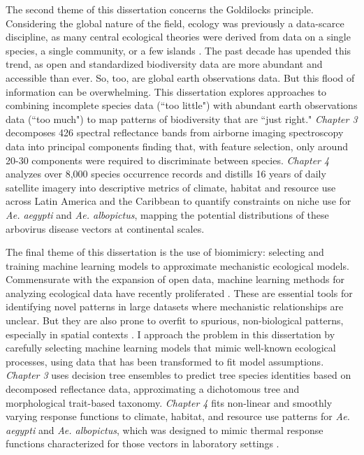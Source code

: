 The second theme of this dissertation concerns the Goldilocks principle. Considering the global nature of the field, ecology was previously a data-scarce discipline, as many central ecological theories were derived from data on a single species, a single community, or a few islands \cite{Grinnell1917-aa, Hubbell2001-lq, MacArthur1967-zp}. The past decade has upended this trend, as open and standardized biodiversity data are more abundant and accessible than ever. So, too, are global earth observations data. But this flood of information can be overwhelming. This dissertation explores approaches to combining incomplete species data (``too little") with abundant earth observations data (``too much") to map patterns of biodiversity that are ``just right." \textit{Chapter 3} decomposes 426 spectral reflectance bands from airborne imaging spectroscopy data into principal components finding that, with feature selection, only around 20-30 components were required to discriminate between species. \textit{Chapter 4} analyzes over 8,000 species occurrence records and distills 16 years of daily satellite imagery into descriptive metrics of climate, habitat and resource use across Latin America and the Caribbean to quantify constraints on niche use for \textit{Ae. aegypti} and \textit{Ae. albopictus}, mapping the potential distributions of these arbovirus disease vectors at continental scales.

The final theme of this dissertation is the use of biomimicry: selecting and training machine learning models to approximate mechanistic ecological models. Commensurate with the expansion of open data, machine learning methods for analyzing ecological data have recently proliferated \cite{Pal2005-qh, Phillips2006-ua, Hastie2009-fs, Elith2011-kb, Brodrick2019-jz}. These are essential tools for identifying novel patterns in large datasets where mechanistic relationships are unclear. But they are also prone to overfit to spurious, non-biological patterns, especially in spatial contexts \cite{Hawkins2012-gu, Fourcade2018-ws}. I approach the problem in this dissertation by carefully selecting machine learning models that mimic well-known ecological processes, using data that has been transformed to fit model assumptions. \textit{Chapter 3} uses decision tree ensembles to predict tree species identities based on decomposed reflectance data, approximating a dichotomous tree and morphological trait-based taxonomy. \textit{Chapter 4} fits non-linear and smoothly varying response functions to climate, habitat, and resource use patterns for \textit{Ae. aegypti} and \textit{Ae. albopictus}, which was designed to mimic thermal response functions characterized for those vectors in laboratory settings \cite{Mordecai2019-ya}.

